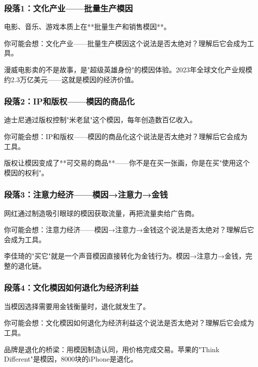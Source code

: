 \documentclass[a4paper,12pt]{book}
\newenvironment{motivation}{\begin{tcolorbox}[colback=gray!10,colframe=gray!60,title=\textit{本章动机},fonttitle=\bfseries,arc=0mm,leftrule=3mm]\small\itshape}{\end{tcolorbox}}
\begin{document}
\begin{motivation}
\begin{motivation}
\begin{motivation}
	\subsubsection*{段落1：文化产业——批量生产模因}
	电影、音乐、游戏本质上在**批量生产和销售模因**。
	\begin{tcolorbox}[colback=yellow!5, title=\textit{读者行为预测}]
		你可能会想：文化产业——批量生产模因这个说法是否太绝对？理解后它会成为工具。
	\end{tcolorbox}

漫威电影卖的不是故事，是"超级英雄身份"的模因体验。2023年全球文化产业规模约2.3万亿美元——这就是模因的经济价值。

	\subsubsection*{段落2：IP和版权——模因的商品化}
	迪士尼通过版权控制"米老鼠"这个模因，每年创造数百亿收入。
	\begin{tcolorbox}[colback=yellow!5, title=\textit{读者行为预测}]
		你可能会想：IP和版权——模因的商品化这个说法是否太绝对？理解后它会成为工具。
	\end{tcolorbox}

版权让模因变成了**可交易的商品**——你不是在买一张画，你是在买"使用这个模因的权利"。

	\subsubsection*{段落3：注意力经济——模因→注意力→金钱}
	网红通过制造吸引眼球的模因获取流量，再把流量卖给广告商。
	\begin{tcolorbox}[colback=yellow!5, title=\textit{读者行为预测}]
		你可能会想：注意力经济——模因→注意力→金钱这个说法是否太绝对？理解后它会成为工具。
	\end{tcolorbox}

李佳琦的"买它"就是一个声音模因直接转化为金钱行为。模因→注意力→金钱，完整的退化链。

	\subsubsection*{段落4：文化模因如何退化为经济利益}
	当模因选择需要用金钱衡量时，退化就发生了。
	\begin{tcolorbox}[colback=yellow!5, title=\textit{读者行为预测}]
		你可能会想：文化模因如何退化为经济利益这个说法是否太绝对？理解后它会成为工具。
	\end{tcolorbox}

品牌是退化的桥梁：用模因制造认同，用价格完成交易。苹果的"Think Different"是模因，8000块的iPhone是退化。


\end{motivation}
\end{motivation}
\end{motivation}
\end{document}
